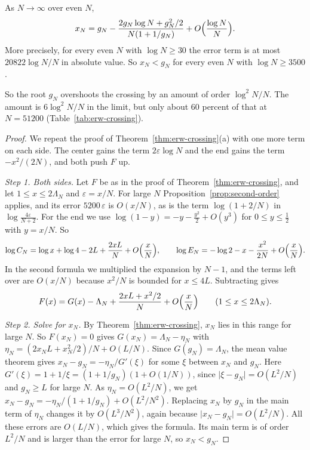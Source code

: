 \begin{proposition}\label{prop:refined}
As $N\to\infty$ over even $N$,
\[
 x_N=g_N-\frac{2g_N\log N+g_N^2/2}{N(1+1/g_N)}+O\Bigl(\frac{\log N}N\Bigr).
\]
More precisely, for every even $N$ with $\log N\ge30$ the error term is at most
$20822\log N/N$ in absolute value. So $x_N<g_N$ for every even $N$ with $\log N\ge3500$.
\end{proposition}

So the root $g_N$ overshoots the crossing by an amount of order $\log^2N/N$. The
amount is $6\log^2N/N$ in the limit, but only about 60 percent of that at $N=51200$
(Table~\ref{tab:erw-crossing}).

\begin{proof}
We repeat the proof of Theorem~\ref{thm:erw-crossing}(a) with one more term
on each side. The center gains the term $2\varepsilon\log N$ and the end
gains the term $-x^2/(2N)$, and both push $F$ up.

\emph{Step 1. Both sides.} Let $F$ be as in the proof of
Theorem~\ref{thm:erw-crossing}, and let $1\le x\le2\Lambda_N$ and
$\varepsilon=x/N$. For large $N$ Proposition~\ref{prop:second-order} applies,
and its error $5200\,\varepsilon$ is $O(x/N)$, as is the term
$\log(1+2/N)$ in $\log\frac{4\varepsilon}{N+2}$. For the end we use
$\log(1-y)=-y-\frac{y^2}2+O(y^3)$ for $0\le y\le\frac12$ with $y=x/N$. So
\[
 \log C_N=\log x+\log4-2L+\frac{2xL}N+O\Bigl(\frac xN\Bigr),\qquad
 \log E_N=-\log2-x-\frac{x^2}{2N}+O\Bigl(\frac xN\Bigr).
\]
In the second formula we multiplied the expansion by $N-1$, and the terms
left over are $O(x/N)$ because $x^2/N$ is bounded for $x\le4L$. Subtracting
gives
\[
 F(x)=G(x)-\Lambda_N+\frac{2xL+x^2/2}{N}+O\Bigl(\frac xN\Bigr)
 \qquad(1\le x\le2\Lambda_N).
\]

\emph{Step 2. Solve for $x_N$.} By Theorem~\ref{thm:erw-crossing}, $x_N$ lies
in this range for large $N$. So $F(x_N)=0$ gives $G(x_N)=\Lambda_N-\eta_N$
with $\eta_N=(2x_NL+x_N^2/2)/N+O(L/N)$. Since $G(g_N)=\Lambda_N$, the mean
value theorem gives
$x_N-g_N=-\eta_N/G'(\xi)$ for some $\xi$ between $x_N$ and $g_N$. Here
$G'(\xi)=1+1/\xi=(1+1/g_N)(1+O(1/N))$, since $\lvert\xi-g_N\rvert=O(L^2/N)$
and $g_N\ge L$ for large $N$. As $\eta_N=O(L^2/N)$, we get
$x_N-g_N=-\eta_N/(1+1/g_N)+O(L^2/N^2)$. Replacing $x_N$ by $g_N$ in the main
term of $\eta_N$ changes it by $O(L^3/N^2)$, again because
$\lvert x_N-g_N\rvert=O(L^2/N)$. All these errors are $O(L/N)$, which gives
the formula. Its main term is of order $L^2/N$ and is larger than the error
for large $N$, so $x_N<g_N$.


\end{proof}
